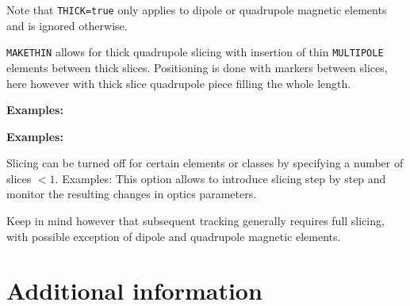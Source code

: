 Note that {\tt THICK=true} only applies to dipole or quadrupole magnetic
elements and is ignored otherwise.

{\tt MAKETHIN} allows for thick quadrupole slicing with insertion of
thin {\tt MULTIPOLE} elements between thick slices. 
Positioning is done with markers between
slices, here however with thick slice quadrupole piece filling the whole
length.
  
\begin{5.02.04}
{\bf Examples:}
\end{5.02.04}
\begin{5.02.05}
{\bf Examples:}
\end{5.02.05}


Slicing can be turned off for certain elements or classes by specifying
a number of slices $< 1$. Examples: 
This option allows to introduce slicing step by step and monitor the 
resulting changes in optics parameters.

Keep in mind however that subsequent tracking generally requires full
slicing, with possible exception of dipole and quadrupole magnetic elements. 


\section{Additional information}

